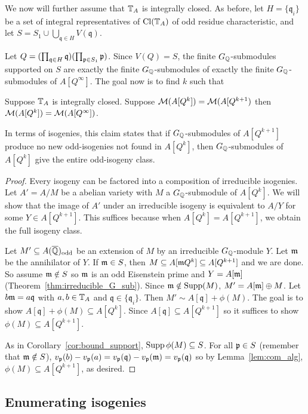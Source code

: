 \documentclass{article}
\renewcommand{\q}{\mathfrak{q}}
\newcommand{\odd}{\mathrm{odd}}
\begin{document}
We now will further assume that $\mathbb{T}_A$ is integrally closed. As before, let
$H=\{\q_i\}$ be a set of integral representatives of $\operatorname{Cl}(\mathbb{T}_A)$ of odd
residue characteristic, and let ${S=S_1\cup\bigcup_{\q\in H}V(\q)}$.

Let $Q = (\prod_{\q\in H} \q)(\prod_{\p\in S_1} \p)$. Since $V(Q)=S$, the finite
$G_{\mathbb{Q}}$-submodules supported on $S$ are exactly the finite $G_{\mathbb{Q}}$-submodules of
exactly the finite $G_{\mathbb{Q}}$-submodules of $A[Q^\infty]$. The goal now is to find $k$
such that 

\begin{corollary}
    \label{cor:set_of_reps}
    Suppose $\mathbb{T}_A$ is integrally closed. Suppose $\mathcal{M}(A[Q^k])=\mathcal{M}(A[Q^{k+1})$
    then $\mathcal{M}(A[Q^k])=\mathcal{M}(A[Q^\infty])$.

    In terms of isogenies, this claim states that if $G_{\mathbb{Q}}$-submodules of
    $A[Q^{k+1}]$ produce no new odd-isogenies not found in $A[Q^k]$, then
    $G_{\mathbb{Q}}$-submodules of $A[Q^k]$ give the entire odd-isogeny class.
\end{corollary}
\begin{proof}
    Every isogeny can be factored into a composition of irreducible isogenies.
    Let $A'=A/M$ be a abelian variety with $M$ a $G_{\mathbb{Q}}$-submodule of $A[Q^k]$. We
    will show that the image of $A'$ under an irreducible isogeny is equivalent
    to $A/Y$ for some $Y\in A[Q^{k+1}]$. This suffices because when
    $A[Q^k]=A[Q^{k+1}]$, we obtain the full isogeny class.

    Let $M'\subseteq A(\QQbar)_\odd$ be an extension of $M$ by an irreducible
    $G_{\mathbb{Q}}$-module $Y$. Let $\mathfrak{m}$ be the annihilator of $Y$. If $\mathfrak{m}\in S$, then
    $M\subseteq A[\mathfrak{m} Q^k]\subseteq A[Q^{k+1}]$ and we are done. So assume
    $\mathfrak{m}\notin S$ so $\mathfrak{m}$ is an odd Eisenstein prime and $Y=A[\mathfrak{m}]$
    (Theorem~\ref{thm:irreducible_G_sub}). Since $\mathfrak{m}\notin \operatorname{Supp}(M)$, $M' =
    A[\mathfrak{m}]\oplus M$. Let $b\m=a\q$ with $a,b\in \mathbb{T}_A$ and $\q\in \{\q_i\}$.
    Then $M'\sim A[\q] + \phi(M)$. The goal is to show $A[\q]+\phi(M)\subseteq
    A[Q^k]$. Since $A[\q]\subseteq A[Q^{k+1}]$ so it suffices to show
    $\phi(M)\subseteq A[Q^{k+1}]$.
    
    As in Corollary~\ref{cor:bound_support}, $\operatorname{Supp}\phi(M)\subseteq S$. For all
    $\mathfrak{p}\in S$ (remember that $\mathfrak{m} \notin S$), $v_\p(b)-v_\p(a) =
    v_\p(\q)-v_\p(\m)=v_\p(\q)$ so by Lemma~\ref{lem:com_alg},
    $\phi(M)\subseteq A[Q^{k+1}]$, as desired.
\end{proof}

\subsection{Enumerating isogenies}%
\label{sub:enumerating_isogenies}
\end{document}
